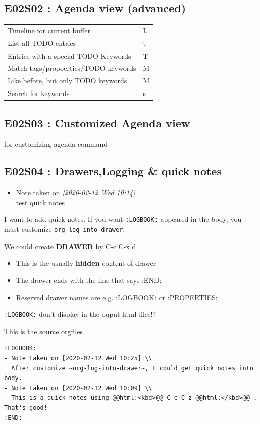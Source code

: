 \documentclass[11pt]{article}
\begin{document}
\subsection{E02S02 : Agenda view (advanced)}
\label{sec:orgb8fa89c}
\begin{center}
\begin{tabular}{ll}
Timeline for current buffer &  L \\
List all TODO entries &  t \\
Entries with a special TODO Keywords &  T \\
Match tags/propoerties/TODO keywords &  M \\
Like before, but only TODO keywords &  M \\
Search for keywords &  s \\
\end{tabular}
\end{center}

\subsection{E02S03 : Customized Agenda view}
\label{sec:org3c01f21}
for customizing agenda command 
\subsection{E02S04 : Drawers,Logging \& quick notes}
\label{sec:org7712197}
\begin{itemize}
\item Note taken on \textit{[2020-02-12 Wed 10:14] } \\
test quick notes
\end{itemize}
I want to add quick notes. If you want \texttt{:LOGBOOK:} appeared in the body, you
must customize \texttt{org-log-into-drawer}.

We could create \textbf{DRAWER} by  C-c C-x d  .

\begin{itemize}
\item This is the usually \textbf{hidden} content of drawer
\item The drawer ends with the line that says :END:
\item Reserved drawer names are e.g. :LOGBOOK: or :PROPERTIES:
\end{itemize}
\texttt{:LOGBOOK:} don't display in the ouput html files!? 

This is the source orgfiles
\begin{verbatim}
:LOGBOOK:
- Note taken on [2020-02-12 Wed 10:25] \\
  After customize ~org-log-into-drawer~, I could get quick notes into body.
- Note taken on [2020-02-12 Wed 10:09] \\
  This is a quick notes using @@html:<kbd>@@ C-c C-z @@html:</kbd>@@ . That's good!
:END:
\end{verbatim}
\end{document}
